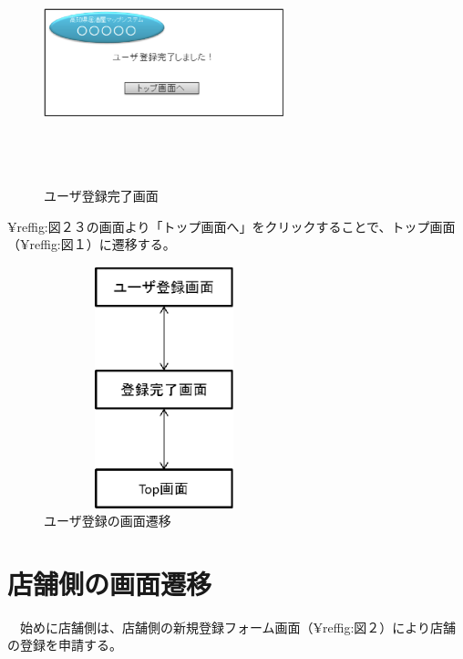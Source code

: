 \documentclass[a4j,titlepage]{jarticle}
\begin{document}
\begin {figure}[!htbp]
    \begin{center}
    \includegraphics [height=7cm, width=7cm]{23.eps}
    \caption {ユーザ登録完了画面}
    \label {fig:23}
    \end{center}
\end {figure}



¥ref{fig:図２３}の画面より「トップ画面へ」をクリックすることで、トップ画面（¥ref{fig:図１}）に遷移する。



\begin {figure}[!htbp]
    \begin{center}
    \includegraphics [height=7cm, width=7cm]{24.eps}
    \caption {ユーザ登録の画面遷移}
    \label {fig:24}
    \end{center}
\end {figure}
\clearpage
\section{店舗側の画面遷移}


　始めに店舗側は、店舗側の新規登録フォーム画面（¥ref{fig:図２}）により店舗の登録を申請する。
\end{document}

